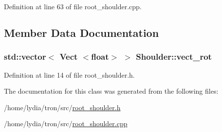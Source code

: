 Definition at line 63 of file root\+\_\+shoulder.\+cpp.



\subsection{Member Data Documentation}
\hypertarget{class_shoulder_a9d8a5bcf46efc7fcd8323410bfdb0646}{
\subsubsection[{vect\+\_\+rot}]{\setlength{\rightskip}{0pt plus 5cm}std\+::vector$<$ {\bf Vect} $<$float$>$ $>$ Shoulder\+::vect\+\_\+rot}}\label{class_shoulder_a9d8a5bcf46efc7fcd8323410bfdb0646}


Definition at line 14 of file root\+\_\+shoulder.\+h.



The documentation for this class was generated from the following files\+:\begin{DoxyCompactItemize}
\item 
/home/lydia/tron/src/\hyperlink{root__shoulder_8h}{root\+\_\+shoulder.\+h}\item 
/home/lydia/tron/src/\hyperlink{root__shoulder_8cpp}{root\+\_\+shoulder.\+cpp}\end{DoxyCompactItemize}
